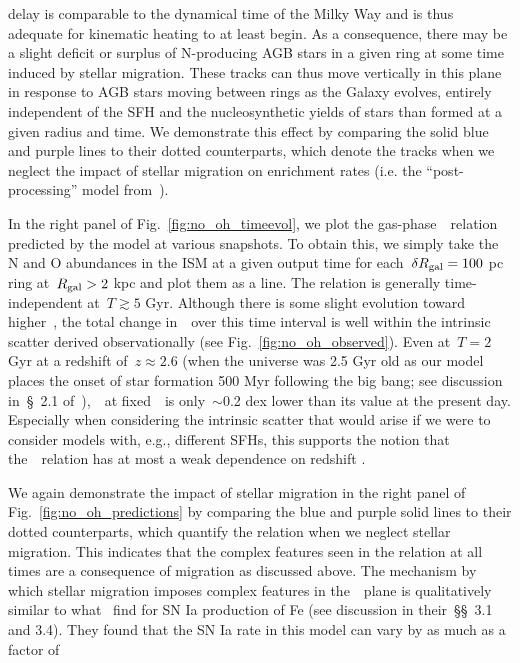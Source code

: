 \documentclass[ms.tex]{subfiles}
\begin{document}
delay is comparable to the dynamical time of the Milky Way and is thus adequate
for kinematic heating to at least begin.
As a consequence, there may be a slight deficit or surplus of N-producing AGB
stars in a given ring at some time induced by stellar migration.
These tracks can thus move vertically in this plane in response to AGB stars
moving between rings as the Galaxy evolves, entirely independent of the SFH and
the nucleosynthetic yields of stars than formed at a given radius and time.
We demonstrate this effect by comparing the solid blue and purple lines to
their dotted counterparts, which denote the tracks when we neglect the impact
of stellar migration on enrichment rates (i.e. the ``post-processing'' model
from~\citealp{Johnson2021}).
\par
In the right panel of Fig.~\ref{fig:no_oh_timeevol}, we plot the
gas-phase~\ohno~relation predicted by the model at various snapshots.
To obtain this, we simply take the N and O abundances in the ISM at a given
output time for each~$\delta R_\text{gal} = 100$ pc ring at~$R_\text{gal} > 2$ kpc and plot
them as a line.
The relation is generally time-independent at~$T \gtrsim 5$ Gyr.
Although there is some slight evolution toward higher~\no, the total change
in~\no~over this time interval is well within the intrinsic scatter derived
observationally (see Fig.~\ref{fig:no_oh_observed}).
Even at~$T = 2$ Gyr at a redshift of~$z \approx 2.6$ (when the universe was
2.5 Gyr old as our model places the onset of star formation 500 Myr following
the big bang; see discussion in~\S~2.1 of~\citealp{Johnson2021}),~\no~at
fixed~\oh~is only~$\sim$0.2 dex lower than its value at the present day.
Especially when considering the intrinsic scatter that would arise if we were
to consider models with, e.g., different SFHs, this supports the notion that
the~\ohno~relation has at most a weak dependence on redshift
\citep{Vincenzo2018, HaydenPawson2021}.
\par
We again demonstrate the impact of stellar migration in the right panel of
Fig.~\ref{fig:no_oh_predictions} by comparing the blue and purple solid lines
to their dotted counterparts, which quantify the relation when we neglect
stellar migration.
This indicates that the complex features seen in the relation at all times are
a consequence of migration as discussed above.
The mechanism by which stellar migration imposes complex features in
the~\ohno~plane is qualitatively similar to what~\citet{Johnson2021} find for
SN Ia production of Fe (see discussion in their~\S\S~3.1 and 3.4).
They found that the SN Ia rate in this model can vary by as much as a factor of
\end{document}
